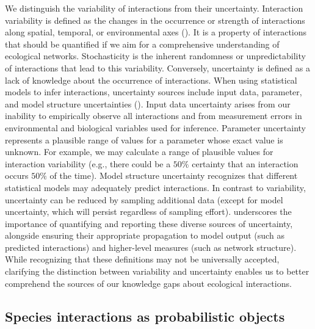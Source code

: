 We distinguish the variability of interactions from their uncertainty.
Interaction variability is defined as the changes in the occurrence or strength
of interactions along spatial, temporal, or environmental axes
(\cite{Poisot2015Species}). It is a property of interactions that should be
quantified if we aim for a comprehensive understanding of ecological networks.
Stochasticity is the inherent randomness or unpredictability of interactions
that lead to this variability. Conversely, uncertainty is defined as a lack of
knowledge about the occurrence of interactions. When using statistical models to
infer interactions, uncertainty sources include input data, parameter, and model
structure uncertainties (\cite{Simmonds2024Recommendations}). Input data uncertainty
arises from our inability to empirically observe all interactions and from
measurement errors in environmental and biological variables used for inference.
Parameter uncertainty represents a plausible range of values for a parameter
whose exact value is unknown. For example, we may calculate a range of plausible
values for interaction variability (e.g., there could be a $50\%$ certainty that
an interaction occurs $50\%$ of the time). Model structure uncertainty
recognizes that different statistical models may adequately predict
interactions. In contrast to variability, uncertainty can be reduced by sampling
additional data (except for model uncertainty, which will persist regardless of
sampling effort). \cite{Simmonds2024Recommendations} underscores the importance of
quantifying and reporting these diverse sources of uncertainty, alongside
ensuring their appropriate propagation to model output (such as predicted
interactions) and higher-level measures (such as network structure). While
recognizing that these definitions may not be universally accepted, clarifying
the distinction between variability and uncertainty enables us to better
comprehend the sources of our knowledge gaps about ecological interactions.

\subsection{Species interactions as probabilistic objects}

